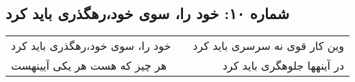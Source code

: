 \begin{center}
\section*{شماره ۱۰: خود را، سوی خود،‌رهگذری باید کرد}
\label{sec:010}
\begin{longtable}{l p{0.5cm} r}
خود را، سوی خود،‌رهگذری باید کرد
&&
وین کار قوی نه سرسری باید کرد
\\
هر چیز که هست هر یکی آیینهست
&&
در آینهها جلوهگری باید کرد
\\
\end{longtable}
\end{center}
